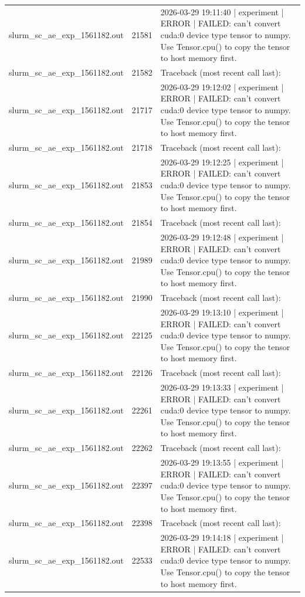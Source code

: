 \begin{tabular}{lrl}
slurm\_sc\_ae\_exp\_1561182.out & 21581 & 2026-03-29 19:11:40 | experiment | ERROR |   FAILED: can't convert cuda:0 device type tensor to numpy. Use Tensor.cpu() to copy the tensor to host memory first. \\
slurm\_sc\_ae\_exp\_1561182.out & 21582 & Traceback (most recent call last): \\
slurm\_sc\_ae\_exp\_1561182.out & 21717 & 2026-03-29 19:12:02 | experiment | ERROR |   FAILED: can't convert cuda:0 device type tensor to numpy. Use Tensor.cpu() to copy the tensor to host memory first. \\
slurm\_sc\_ae\_exp\_1561182.out & 21718 & Traceback (most recent call last): \\
slurm\_sc\_ae\_exp\_1561182.out & 21853 & 2026-03-29 19:12:25 | experiment | ERROR |   FAILED: can't convert cuda:0 device type tensor to numpy. Use Tensor.cpu() to copy the tensor to host memory first. \\
slurm\_sc\_ae\_exp\_1561182.out & 21854 & Traceback (most recent call last): \\
slurm\_sc\_ae\_exp\_1561182.out & 21989 & 2026-03-29 19:12:48 | experiment | ERROR |   FAILED: can't convert cuda:0 device type tensor to numpy. Use Tensor.cpu() to copy the tensor to host memory first. \\
slurm\_sc\_ae\_exp\_1561182.out & 21990 & Traceback (most recent call last): \\
slurm\_sc\_ae\_exp\_1561182.out & 22125 & 2026-03-29 19:13:10 | experiment | ERROR |   FAILED: can't convert cuda:0 device type tensor to numpy. Use Tensor.cpu() to copy the tensor to host memory first. \\
slurm\_sc\_ae\_exp\_1561182.out & 22126 & Traceback (most recent call last): \\
slurm\_sc\_ae\_exp\_1561182.out & 22261 & 2026-03-29 19:13:33 | experiment | ERROR |   FAILED: can't convert cuda:0 device type tensor to numpy. Use Tensor.cpu() to copy the tensor to host memory first. \\
slurm\_sc\_ae\_exp\_1561182.out & 22262 & Traceback (most recent call last): \\
slurm\_sc\_ae\_exp\_1561182.out & 22397 & 2026-03-29 19:13:55 | experiment | ERROR |   FAILED: can't convert cuda:0 device type tensor to numpy. Use Tensor.cpu() to copy the tensor to host memory first. \\
slurm\_sc\_ae\_exp\_1561182.out & 22398 & Traceback (most recent call last): \\
slurm\_sc\_ae\_exp\_1561182.out & 22533 & 2026-03-29 19:14:18 | experiment | ERROR |   FAILED: can't convert cuda:0 device type tensor to numpy. Use Tensor.cpu() to copy the tensor to host memory first. \\

\end{tabular}
